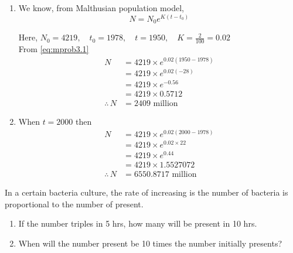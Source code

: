 \documentclass[../main-sheet.tex]{subfiles}
\begin{document}
\begin{soln}
    \begin{enumerate}[label=(\alph*)]
        \item We know, from Malthusian population model,
        \begin{equation}
            N=N_0e^{K(t-t_0)}\label{eq:mprob3.1}
        \end{equation}
        
        
        Here, \(N_0=4219,\quad t_0=1978,\quad t=1950,\quad K=\frac{2}{100}=0.02\)\\
        From \eqref{eq:mprob3.1}
        \begin{align*}
            N&=4219\times e^{0.02(1950-1978)}\\
            &=4219\times e^{0.02(-28)}\\
            &=4219\times e^{-0.56}\\
            &=4219\times 0.5712\\
            \therefore\,N&=2409 \text{ million}
        \end{align*}
        \item When \(t=2000\) then
        \begin{align*}
            N&=4219\times e^{0.02(2000-1978)}\\
            &=4219\times e^{0.02\times 22}\\
            &=4219\times e^{0.44}\\
            &=4219\times 1.5527072\\
            \therefore\,N&=6550.8717 \text{ million}
        \end{align*}
    \end{enumerate}
\end{soln}
\begin{prob}
    In a certain bacteria culture, the rate of increasing is the number of bacteria is proportional to the number of present.
    \begin{enumerate}[label=(\alph*)]
        \item If the number triples in 5 hrs, how many will be present in 10 hrs.
        \item When will the number present be 10 times the number initially presents?
    \end{enumerate}
\end{prob}
\end{document}
